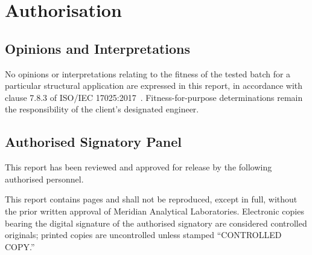 \section{Authorisation}

\subsection{Opinions and Interpretations}
No opinions or interpretations relating to the fitness of the tested batch for a particular
structural application are expressed in this report, in accordance with clause 7.8.3 of
ISO/IEC 17025:2017~\cite{iso17025}. Fitness-for-purpose determinations remain the responsibility
of the client's designated engineer.

\subsection{Authorised Signatory Panel}
This report has been reviewed and approved for release by the following authorised personnel.

\vspace{0.6em}
%
\hfill
{}%
\hfill
{}
\par
\vspace{1.4em}

\begin{tcolorbox}[infobox,title=End of Report]
\small
This report contains \pageref{LastPage} pages and shall not be reproduced, except in full, without the prior
written approval of Meridian Analytical Laboratories. Electronic copies bearing the digital
signature of the authorised signatory are considered controlled originals; printed copies are
uncontrolled unless stamped ``CONTROLLED COPY.''
\end{tcolorbox}
